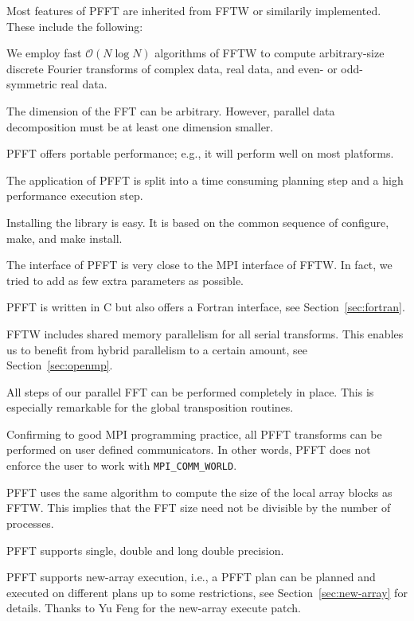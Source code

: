 Most features of PFFT are inherited from FFTW or similarily implemented. These include the following:
\begin{compactitem}
  \item We employ fast $\mathcal{O}(N\log N)$ algorithms of FFTW to compute arbitrary-size
        discrete Fourier transforms of complex data, real data, and even- or odd-symmetric real data.
  \item The dimension of the FFT can be arbitrary. However, parallel data decomposition must be at least one dimension smaller.
  \item PFFT offers portable performance; e.g., it will perform well on most platforms.
  \item The application of PFFT is split into a time consuming planning step and a high performance execution step.
  \item Installing the library is easy. It is based on the common sequence of configure, make, and make install.
  \item The interface of PFFT is very close to the MPI interface of FFTW.
        In fact, we tried to add as few extra parameters as possible.
  \item PFFT is written in C but also offers a Fortran interface, see Section~\ref{sec:fortran}.
  \item FFTW includes shared memory parallelism for all serial transforms. This enables us to benefit from hybrid parallelism to a certain amount, see Section~\ref{sec:openmp}.
  \item All steps of our parallel FFT can be performed completely in place. This is especially remarkable for the global
        transposition routines.
  \item Confirming to good MPI programming practice, all PFFT transforms can be performed on user defined communicators.
        In other words, PFFT does not enforce the user to work with \verb+MPI_COMM_WORLD+.
  \item PFFT uses the same algorithm to compute the size of the local array blocks as FFTW. This implies that the FFT size need not
        be divisible by the number of processes.
  \item PFFT supports single, double and long double precision.
  \item PFFT supports new-array execution, i.e., a PFFT plan can be planned and executed on different plans up to some restrictions, see Section~\ref{sec:new-array} for details.
        Thanks to Yu Feng for the new-array execute patch.
\end{compactitem}
